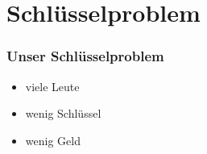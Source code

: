 \section{Schlüsselproblem}
\begin{frame}
	\frametitle{Unser Schlüsselproblem}
	\begin{itemize}
		\item viele Leute
		\item wenig Schlüssel
		\item wenig Geld
	\end{itemize}
\end{frame}
